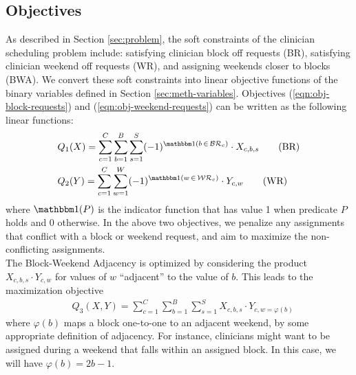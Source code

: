 \subsection{Objectives} \label{sec:meth-objectives}
As described in Section \ref{sec:problem}, the soft constraints of the clinician scheduling problem include: satisfying clinician block off requests (BR), satisfying clinician weekend off requests (WR), and assigning weekends closer to blocks (BWA). We convert these soft constraints into linear objective functions of the binary variables defined in Section \ref{sec:meth-variables}. Objectives (\ref{eqn:obj-block-requests}) and (\ref{eqn:obj-weekend-requests}) can be written as the following linear functions:  %
\begin{align}
	&Q_1(X) = \sum_{c=1}^{C} \sum_{b=1}^{B} \sum_{s=1}^{S} (-1)^{\ind(b\,\in\,\mathcal{BR}_c)}\cdot X_{c, b, s} \tag{BR} \label{eqn:obj-block-requests}\\
	&Q_2(Y) = \sum_{c=1}^{C} \sum_{w=1}^{W} (-1)^{\ind(w\,\in\,\mathcal{WR}_c)}\cdot Y_{c, w} \tag{WR} \label{eqn:obj-weekend-requests}
\end{align}
where $\ind(P)$ is the indicator function that has value 1 when predicate $P$ holds and 0 otherwise. In the above two objectives, we penalize any assignments that conflict with a block or weekend request, and aim to maximize the non-conflicting assignments. \\

The Block-Weekend Adjacency is optimized by considering the product $X_{c, b, s}\cdot Y_{c, w}$ for values of $w$ ``adjacent'' to the value of $b$. This leads to the maximization objective %
\begin{align}
&Q_3(X, Y) = \sum_{c=1}^{C} \sum_{b=1}^{B} \sum_{s=1}^{S} X_{c, b, s}\cdot Y_{c, w=\varphi(b)} \tag{BWA} \label{eqn:obj-block-weekend-adj}
\end{align}
where $\varphi(b)$ maps a block one-to-one to an adjacent weekend, by some appropriate definition of adjacency. For instance, clinicians might want to be assigned during a weekend that falls within an assigned block. In this case, we will have $\varphi(b) = 2b-1$. \\


